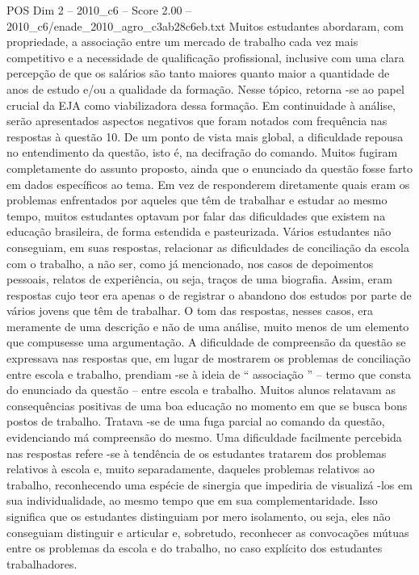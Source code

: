 \begin{textsample}{POS Dim 2 – 2010\_c6 – Score 2.00 – 2010\_c6/enade\_2010\_agro\_c3ab28c6eb.txt}
Muitos estudantes abordaram, com propriedade, a associação entre um mercado de trabalho cada vez mais competitivo e a necessidade de qualificação profissional, inclusive com uma clara percepção de que os salários são tanto maiores quanto maior a quantidade de anos de estudo e/ou a qualidade da formação.
Nesse tópico, retorna -se ao papel crucial da EJA como viabilizadora dessa formação.
Em continuidade à análise, serão apresentados aspectos negativos que foram notados com frequência nas respostas à questão 10.
De um ponto de vista mais global, a dificuldade repousa no entendimento da questão, isto é, na decifração do comando.
Muitos fugiram completamente do assunto proposto, ainda que o enunciado da questão fosse farto em dados específicos ao tema.
Em vez de responderem diretamente quais eram os problemas enfrentados por aqueles que têm de trabalhar e estudar ao mesmo tempo, muitos estudantes optavam por falar das dificuldades que existem na educação brasileira, de forma estendida e pasteurizada.
Vários estudantes não conseguiam, em suas respostas, relacionar as dificuldades de conciliação da escola com o trabalho, a não ser, como já mencionado, nos casos de depoimentos pessoais, relatos de experiência, ou seja, traços de uma biografia.
Assim, eram respostas cujo teor era apenas o de registrar o abandono dos estudos por parte de vários jovens que têm de trabalhar.
O tom das respostas, nesses casos, era meramente de uma descrição e não de uma análise, muito menos de um elemento que compusesse uma argumentação.
A dificuldade de compreensão da questão se expressava nas respostas que, em lugar de mostrarem os problemas de conciliação entre escola e trabalho, prendiam -se à ideia de “ associação ” – termo que consta do enunciado da questão – entre escola e trabalho.
Muitos alunos relatavam as consequências positivas de uma boa educação no momento em que se busca bons postos de trabalho.
Tratava -se de uma fuga parcial ao comando da questão, evidenciando má compreensão do mesmo.
Uma dificuldade facilmente percebida nas respostas refere -se à tendência de os estudantes tratarem dos problemas relativos à escola e, muito separadamente, daqueles problemas relativos ao trabalho, reconhecendo uma espécie de sinergia que impediria de visualizá -los em sua individualidade, ao mesmo tempo que em sua complementaridade.
Isso significa que os estudantes distinguiam por mero isolamento, ou seja, eles não conseguiam distinguir e articular e, sobretudo, reconhecer as convocações mútuas entre os problemas da escola e do trabalho, no caso explícito dos estudantes trabalhadores.

\end{textsample}
